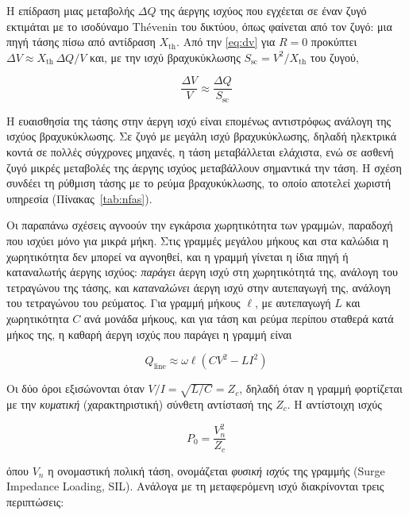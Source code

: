 Η επίδραση μιας μεταβολής $\Delta Q$ της άεργης ισχύος που εγχέεται σε έναν ζυγό εκτιμάται με
το ισοδύναμο Thévenin του δικτύου, όπως φαίνεται από τον ζυγό: μια πηγή τάσης πίσω από
αντίδραση $X_{\mathrm{th}}$. Από την \eqref{eq:dv} για $R = 0$ προκύπτει
$\Delta V \approx X_{\mathrm{th}}\,\Delta Q / V$ και, με την ισχύ βραχυκύκλωσης
$S_{\mathrm{sc}} = V^2 / X_{\mathrm{th}}$ του ζυγού,

\begin{equation}
\frac{\Delta V}{V} \approx \frac{\Delta Q}{S_{\mathrm{sc}}}
\label{eq:dv-ssc}
\end{equation}

Η ευαισθησία της τάσης στην άεργη ισχύ είναι επομένως αντιστρόφως ανάλογη της ισχύος
βραχυκύκλωσης. Σε ζυγό με μεγάλη ισχύ βραχυκύκλωσης, δηλαδή ηλεκτρικά κοντά σε πολλές
σύγχρονες μηχανές, η τάση μεταβάλλεται ελάχιστα, ενώ σε ασθενή ζυγό μικρές μεταβολές της
άεργης ισχύος μεταβάλλουν σημαντικά την τάση. Η σχέση συνδέει τη ρύθμιση τάσης με το ρεύμα
βραχυκύκλωσης, το οποίο αποτελεί χωριστή υπηρεσία (Πίνακας~\ref{tab:nfas}).

Οι παραπάνω σχέσεις αγνοούν την εγκάρσια χωρητικότητα των γραμμών, παραδοχή που ισχύει μόνο
για μικρά μήκη. Στις γραμμές μεγάλου μήκους και στα καλώδια η χωρητικότητα δεν μπορεί να
αγνοηθεί, και η γραμμή γίνεται η ίδια πηγή ή καταναλωτής άεργης ισχύος: \emph{παράγει} άεργη
ισχύ στη χωρητικότητά της, ανάλογη του τετραγώνου της τάσης, και \emph{καταναλώνει} άεργη ισχύ
στην αυτεπαγωγή της, ανάλογη του τετραγώνου του ρεύματος. Για γραμμή μήκους $\ell$, με
αυτεπαγωγή $L$ και χωρητικότητα $C$ ανά μονάδα μήκους, και για τάση και ρεύμα περίπου σταθερά
κατά μήκος της, η καθαρή άεργη ισχύς που παράγει η γραμμή είναι

\begin{equation}
Q_{\mathrm{line}} \approx \omega \ell \left( C V^2 - L I^2 \right)
\label{eq:qline}
\end{equation}

Οι δύο όροι εξισώνονται όταν $V/I = \sqrt{L/C} = Z_c$, δηλαδή όταν η γραμμή φορτίζεται με την
\emph{κυματική} (χαρακτηριστική) σύνθετη αντίστασή της $Z_c$. Η αντίστοιχη ισχύς

\begin{equation}
P_0 = \frac{V_n^2}{Z_c}
\label{eq:sil}
\end{equation}

όπου $V_n$ η ονομαστική πολική τάση, ονομάζεται \emph{φυσική ισχύς} της γραμμής (Surge
Impedance Loading, SIL). Ανάλογα με τη μεταφερόμενη ισχύ διακρίνονται τρεις περιπτώσεις:

